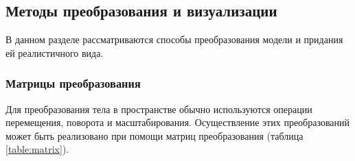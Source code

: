 \subsection{Методы преобразования и визуализации}

В данном разделе рассматриваются способы преобразования модели и 
придания ей реалистичного вида.

\subsubsection{Матрицы преобразования}

Для преобразования тела в пространстве обычно используются операции 
перемещения, поворота и масштабирования.
Осуществление этих преобразований может быть реализовано при помощи матриц преобразования \cite{transformations} (таблица \ref{table:matrix}).

